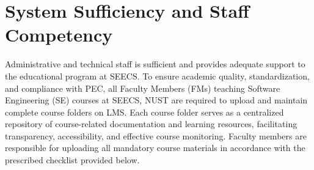 
\section{System Sufficiency and Staff Competency}
\label{sufficiency-and-competency-of-technical-and-administrative-staff}

Administrative and technical staff is sufficient and provides adequate support to the educational program at SEECS. To ensure academic quality, standardization, and compliance with PEC, all Faculty Members (FMs) teaching Software Engineering (SE) courses at SEECS, NUST are required to upload and maintain complete course folders on LMS. Each course folder serves as a centralized repository of course-related documentation and learning resources, facilitating transparency, accessibility, and effective course monitoring. Faculty members are responsible for uploading all mandatory course materials in accordance with the prescribed checklist provided below.
